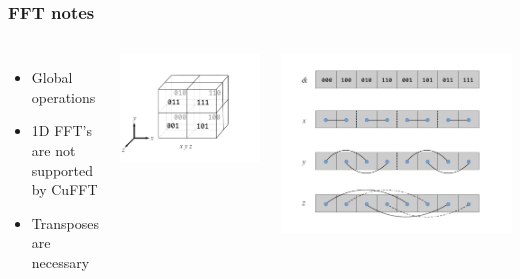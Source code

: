 \documentclass{beamer}
\begin{document}
\begin{frame}
\frametitle{FFT notes}
\begin{columns}
\begin{itemize}
\item Global operations
\item 1D FFT's are not supported by CuFFT
\pause
\item Transposes are necessary
\end{itemize}
\center \includegraphics[width=\textwidth]{../data/gpu/fft/fft_fig.png}

\center \includegraphics[width=\textwidth]{../data/gpu/fft/fft_fig2.png}
\end{columns}

\end{frame}
\end{document}
